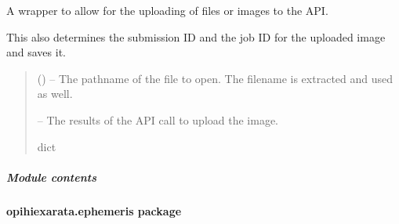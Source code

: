 \documentclass[letterpaper,11pt,english]{sphinxmanual}
\begin{document}
\begin{savenotes}
\begin{fulllineitems}

\begin{savenotes}\begin{fulllineitems}
\label{\detokenize{code/opihiexarata.astrometry.webclient:opihiexarata.astrometry.webclient.AstrometryNetWebAPIEngine.upload_file}}
\pysigstartsignatures
{}
\pysigstopsignatures
\sphinxAtStartPar
A wrapper to allow for the uploading of files or images to the API.

\sphinxAtStartPar
This also determines the submission ID and the job ID for the uploaded
image and saves it.
\begin{quote}\begin{description}
\sphinxAtStartPar
{} () – The pathname of the file to open. The filename is extracted and
used as well.

\sphinxAtStartPar
{} – The results of the API call to upload the image.

\sphinxAtStartPar
dict

\end{description}\end{quote}

\end{fulllineitems}\end{savenotes}


\end{fulllineitems}\end{savenotes}



\subparagraph{Module contents}
\label{\detokenize{code/opihiexarata.astrometry:module-opihiexarata.astrometry}}\label{\detokenize{code/opihiexarata.astrometry:module-contents}}
\sphinxstepscope


\paragraph{opihiexarata.ephemeris package}
\label{\detokenize{code/opihiexarata.ephemeris:opihiexarata-ephemeris-package}}\label{\detokenize{code/opihiexarata.ephemeris::doc}}
\end{document}
